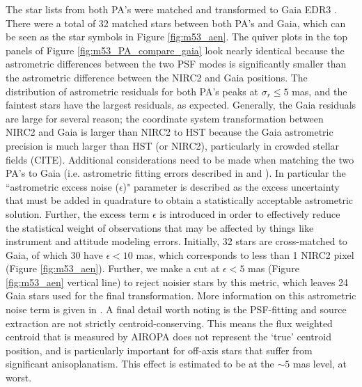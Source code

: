 \documentclass[]{spie}  %
\begin{document}
\indent The star lists from both PA's were matched and transformed to Gaia EDR3 \cite{brown:2021a}. There were a total of 32 matched stars between both PA's and Gaia, which can be seen as the star symbols in Figure \ref{fig:m53_aen}. The quiver plots in the top panels of Figure \ref{fig:m53_PA_compare_gaia} look nearly identical because the astrometric differences between the two PSF modes is significantly smaller than the astrometric difference between the NIRC2 and Gaia positions. The distribution of astrometric residuals for both PA's peaks at $\sigma_{r}\leq5$ mas, and the faintest stars have the largest residuals, as expected. Generally, the Gaia residuals are large for several reason; the coordinate system transformation between NIRC2 and Gaia is larger than NIRC2 to HST because the Gaia astrometric precision is much larger than HST (or NIRC2), particularly in crowded stellar fields (CITE). Additional considerations need to be made when matching the two PA's to Gaia (i.e. astrometric fitting errors described in \cite{brown:2018a} and \cite{brown:2021a}). In particular the ``astrometric excess noise ($\epsilon$)" parameter is described as the excess uncertainty that must be added in quadrature to obtain a statistically acceptable astrometric solution. Further, the excess term $\epsilon$ is introduced in order to effectively reduce the statistical weight of observations that may be affected by things like instrument and attitude modeling errors. Initially, 32 stars are cross-matched to Gaia, of which 30 have $\epsilon <  10$ mas, which corresponds to less than 1 NIRC2 pixel (Figure \ref{fig:m53_aen}). Further, we make a cut at $\epsilon <  5$ mas (Figure \ref{fig:m53_aen} vertical line) to reject noisier stars by this metric, which leaves 24 Gaia stars used for the final transformation. More information on this astrometric noise term is given in \cite{lindegren:2012a}. A final detail worth noting is the PSF-fitting and source extraction are not strictly centroid-conserving. This means the flux weighted centroid that is measured by AIROPA does not represent the `true' centroid position, and is particularly important for off-axis stars that suffer from significant anisoplanatism. This effect is estimated to be at the ${\sim}5$ mas level, at worst.
\end{document}
